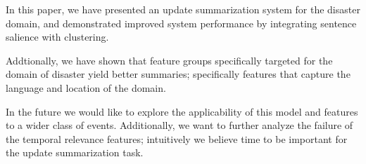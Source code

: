 In this paper, we have presented an update summarization system for the disaster domain,
and demonstrated improved system performance by integrating sentence salience with clustering.

Addtionally, we have shown that feature groups specifically targeted for the domain of disaster yield
better summaries; specifically features that capture the language and location
of the domain.

In the future we would like to explore the applicability of this model and features
to a wider class of events. Additionally, we want to further analyze the failure 
of the temporal relevance features; intuitively we believe time to be important
for the update summarization task.

